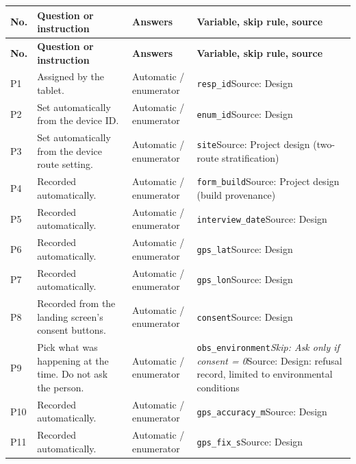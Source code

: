 \documentclass[10pt]{article}
\begin{document}
{\scriptsize
\begin{longtable}{p{0.8cm}p{6.4cm}p{3.6cm}p{5.8cm}}
\toprule
\textbf{No.} & \textbf{Question or instruction} & \textbf{Answers} & \textbf{Variable, skip rule, source} \\
\midrule
\endfirsthead
\toprule
\textbf{No.} & \textbf{Question or instruction} & \textbf{Answers} & \textbf{Variable, skip rule, source} \\
\midrule
\endhead
P1 & Assigned by the tablet. & Automatic / enumerator & \texttt{resp\_id}\newline Source: Design \\
P2 & Set automatically from the device ID. & Automatic / enumerator & \texttt{enum\_id}\newline Source: Design \\
P3 & Set automatically from the device route setting. & Automatic / enumerator & \texttt{site}\newline Source: Project design (two-route stratification) \\
P4 & Recorded automatically. & Automatic / enumerator & \texttt{form\_build}\newline Source: Project design (build provenance) \\
P5 & Recorded automatically. & Automatic / enumerator & \texttt{interview\_date}\newline Source: Design \\
P6 & Recorded automatically. & Automatic / enumerator & \texttt{gps\_lat}\newline Source: Design \\
P7 & Recorded automatically. & Automatic / enumerator & \texttt{gps\_lon}\newline Source: Design \\
P8 & Recorded from the landing screen's consent buttons. & Automatic / enumerator & \texttt{consent}\newline Source: Design \\
P9 & Pick what was happening at the time. Do not ask the person. & Automatic / enumerator & \texttt{obs\_environment}\newline \textit{Skip: Ask only if consent = 0}\newline Source: Design: refusal record, limited to environmental conditions \\
P10 & Recorded automatically. & Automatic / enumerator & \texttt{gps\_accuracy\_m}\newline Source: Design \\
P11 & Recorded automatically. & Automatic / enumerator & \texttt{gps\_fix\_s}\newline Source: Design \\

\end{longtable}}
\end{document}
